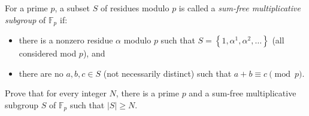 For a prime $p$, a subset $S$ of residues modulo $p$ is called a \emph{sum-free multiplicative subgroup} of $\mathbb F_p$ if:
\begin{itemize}
	\item there is a nonzero residue $\alpha$ modulo $p$ such that $S = \left\{ 1, \alpha^1, \alpha^2, \dots \right\}$ (all considered mod $p$), and
	\item there are no $a,b,c \in S$ (not necessarily distinct) such that $a+b \equiv c \pmod p$.
\end{itemize}
Prove that for every integer $N$, there is a prime $p$ and a sum-free multiplicative subgroup $S$ of $\mathbb F_p$ such that $\left|S\right|\geq N$.